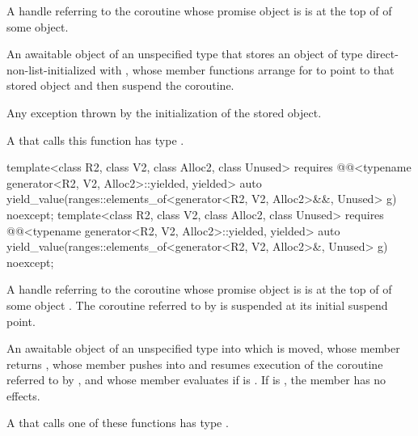 \begin{itemdescr}
\pnum
\expects
A handle referring to the coroutine
whose promise object is 
is at the top of 
of some  object.

\pnum
\returns
An awaitable object of an unspecified type
that stores an object of type 
direct-non-list-initialized with ,
whose member functions arrange for
 to point to that stored object
and then suspend the coroutine.

\pnum
\throws
Any exception thrown by the initialization of the stored object.

\pnum
\remarks
A  that calls this function
has type .
\end{itemdescr}

%
\begin{itemdecl}
template<class R2, class V2, class Alloc2, class Unused>
  requires @@<typename generator<R2, V2, Alloc2>::yielded, yielded>
  auto yield_value(ranges::elements_of<generator<R2, V2, Alloc2>&&, Unused> g) noexcept;
template<class R2, class V2, class Alloc2, class Unused>
  requires @@<typename generator<R2, V2, Alloc2>::yielded, yielded>
  auto yield_value(ranges::elements_of<generator<R2, V2, Alloc2>&, Unused> g) noexcept;
\end{itemdecl}

\begin{itemdescr}
\pnum
\expects
A handle referring to the coroutine
whose promise object is 
is at the top of 
of some  object .
The coroutine referred to by
is suspended at its initial suspend point.

\pnum
\returns
An awaitable object of an unspecified type
into which  is moved,
whose member  returns ,
whose member 
pushes \mbox{}
into 
and resumes execution of the coroutine referred to
by , and
whose member  evaluates
if  is .
If  is ,
the  member has no effects.

\pnum
\remarks
A  that calls one of these functions
has type .
\end{itemdescr}

